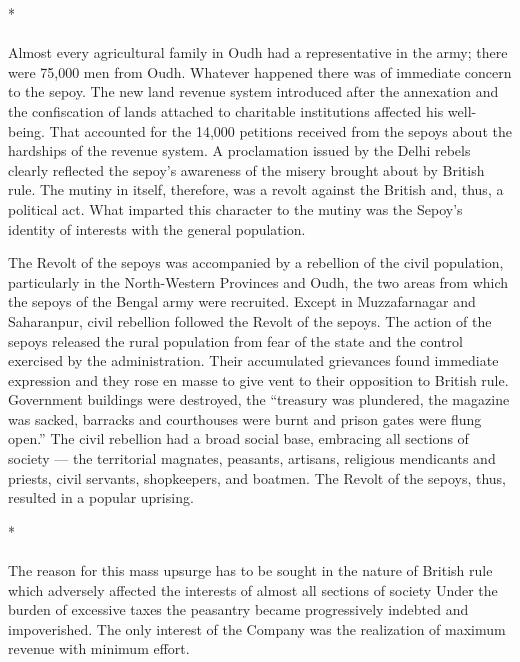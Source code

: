 \begin{center}*\end{center}

\paragraph*{}
Almost every agricultural family in Oudh had a representative in the army; there were 75,000 men from Oudh. Whatever happened there was of immediate concern to the sepoy. The new land revenue system introduced after the annexation and the confiscation of lands attached to charitable institutions affected his well-being. That accounted for the 14,000 petitions received from the sepoys about the hardships of the revenue system. A proclamation issued by the Delhi rebels clearly reflected the sepoy's awareness of the misery brought about by British rule. The mutiny in itself, therefore, was a revolt against the British and, thus, a political act. What imparted this character to the mutiny was the Sepoy's identity of interests with the general population.

The Revolt of the sepoys was accompanied by a rebellion of the civil population, particularly in the North-Western Provinces and Oudh, the two areas from which the sepoys of the Bengal army were recruited. Except in Muzzafarnagar and Saharanpur, civil rebellion followed the Revolt of the sepoys. The action of the sepoys released the rural population from fear of the state and the control exercised by the administration. Their accumulated grievances found immediate expression and they rose en masse to give vent to their opposition to British rule. Government buildings were destroyed, the ``treasury was plundered, the magazine was sacked, barracks and courthouses were burnt and prison gates were flung open.'' The civil rebellion had a broad social base, embracing all sections of society --- the territorial magnates, peasants, artisans, religious mendicants and priests, civil servants, shopkeepers, and boatmen. The Revolt of the sepoys, thus, resulted in a popular uprising.

\begin{center}*\end{center}

\paragraph*{}
The reason for this mass upsurge has to be sought in the nature of British rule which adversely affected the interests of almost all sections of society Under the burden of excessive taxes the peasantry became progressively indebted and impoverished. The only interest of the Company was the realization of maximum revenue with minimum effort.


